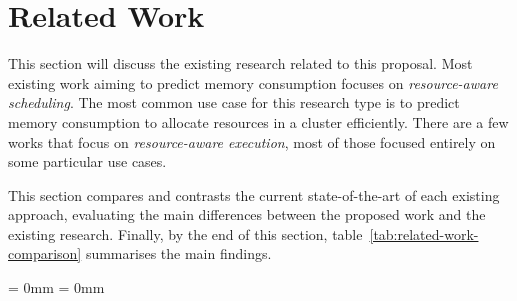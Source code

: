 \section{Related Work}
\label{sec:related-work}

This section will discuss the existing research related to this proposal.
Most existing work aiming to predict memory consumption focuses on \emph{resource-aware scheduling}.
The most common use case for this research type is to predict memory consumption to allocate resources in a cluster efficiently.
There are a few works that focus on \emph{resource-aware execution}, most of those focused entirely on some particular use cases.

This section compares and contrasts the current state-of-the-art of each existing approach, evaluating the main differences between the proposed work and the existing research.
Finally, by the end of this section, table~\ref{tab:related-work-comparison} summarises the main findings.




\aboverulesep = 0mm
\belowrulesep = 0mm

